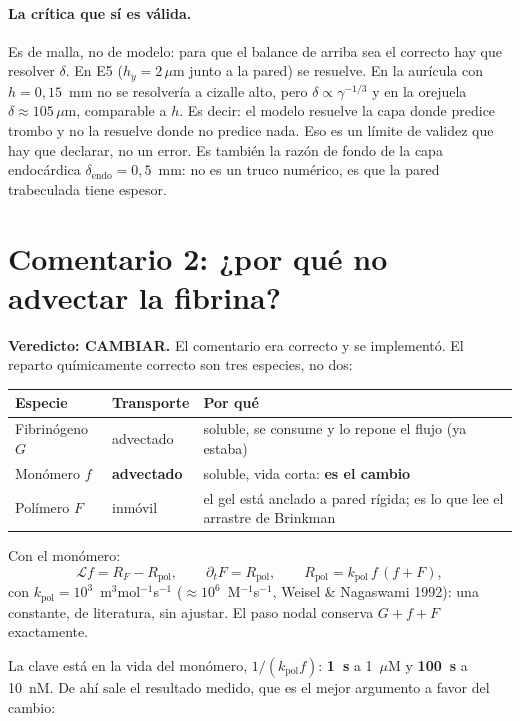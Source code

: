 \documentclass[11pt,a4paper]{article}
\newcommand{\CAMB}{\textcolor{chg}{\textbf{CAMBIAR}}}
\begin{document}
\paragraph{La crítica que sí es válida.} Es de malla, no de modelo: para que el
balance de arriba sea el correcto hay que resolver $\delta$. En E5
($h_y=2\,\mu$m junto a la pared) se resuelve. En la aurícula con $h=0{,}15$~mm no
se resolvería a cizalle alto, pero $\delta\propto\gamma^{-1/3}$ y en la orejuela
$\delta\approx105\,\mu$m, comparable a $h$. Es decir: el modelo resuelve la capa
donde predice trombo y no la resuelve donde no predice nada. Eso es un límite de
validez que hay que declarar, no un error. Es también la razón de fondo de la capa
endocárdica $\delta_{\mathrm{endo}}=0{,}5$~mm: no es un truco numérico, es que la
pared trabeculada tiene espesor.

\section{Comentario 2: ¿por qué no advectar la fibrina?}

\textbf{Veredicto: \CAMB.} El comentario era correcto y se implementó. El reparto
químicamente correcto son tres especies, no dos:

\begin{center}
\small
\begin{tabular}{@{}llp{7.2cm}@{}}
\toprule
Especie & Transporte & Por qué \\
\midrule
Fibrinógeno $G$ & advectado & soluble, se consume y lo repone el flujo (ya estaba) \\
Monómero $f$ & \textbf{advectado} & soluble, vida corta: \textbf{es el cambio} \\
Polímero $F$ & inmóvil & el gel está anclado a pared rígida; es lo que lee el arrastre de Brinkman \\
\bottomrule
\end{tabular}
\end{center}

\noindent
Con el monómero:
%
\begin{equation}
\mathcal{L}f = R_F - R_{\mathrm{pol}},
\qquad
\partial_t F = R_{\mathrm{pol}},
\qquad
R_{\mathrm{pol}} = k_{\mathrm{pol}}\,f\,(f+F),
\end{equation}
%
con $k_{\mathrm{pol}}=10^{3}$~m$^3$mol$^{-1}$s$^{-1}$ ($\approx10^{6}$~M$^{-1}$s$^{-1}$,
Weisel \& Nagaswami 1992): una constante, de literatura, sin ajustar. El paso nodal
conserva $G+f+F$ exactamente.

La clave está en la vida del monómero, $1/(k_{\mathrm{pol}}f)$: \textbf{1~s} a
1~$\mu$M y \textbf{100~s} a 10~nM. De ahí sale el resultado medido, que es el
mejor argumento a favor del cambio:
\end{document}

